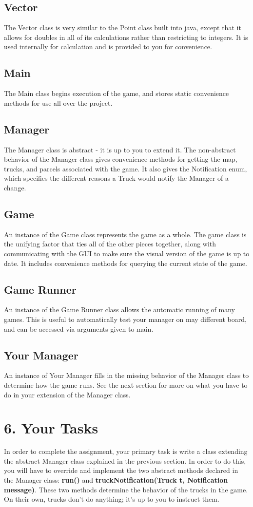 \documentclass[11pt]{article}
\begin{document}
\subsection{Vector}
The Vector class is very similar to the Point class built into java, except that it allows for doubles in all of its calculations rather than restricting to integers. It is used internally for calculation and is provided to you for convenience.
\subsection{Main}
The Main class begins execution of the game, and stores static convenience methods for use all over the project.
\subsection{Manager}
The Manager class is abstract - it is up to you to extend it. The non-abstract behavior of the Manager class gives convenience methods for getting the map, trucks, and parcels associated with the game. It also gives the Notification enum, which specifies the different reasons a Truck would notify the Manager of a change.
\subsection{Game}
An instance of the Game class represents the game as a whole. The game class is the unifying factor that ties all of the other pieces together, along with communicating with the GUI to make sure the visual version of the game is up to date. It includes convenience methods for querying the current state of the game.
\subsection{Game Runner}
An instance of the Game Runner class allows the automatic running of many games. This is useful to automatically test your manager on may different board, and can be accessed via arguments given to main.
\subsection{Your Manager}
An instance of Your Manager fills in the missing behavior of the Manager class to determine how the game runs. See the next section for more on what you have to do in your extension of the Manager class.

\newpage
\section{6. Your Tasks}
In order to complete the assignment, your primary task is write a class extending the abstract Manager class explained in the previous section. In order to do this, you will have to override and implement the two abstract methods declared in the Manager class: \textbf{run()} and \textbf{truckNotification(Truck t, Notification message)}. These two methods determine the behavior of the trucks in the game. On their own, trucks don't do anything; it's up to you to instruct them.\\
\end{document}
